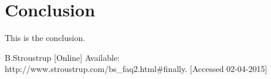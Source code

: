 \documentclass[11pt, oneside]{article}   %
\begin{document}
\newpage
\newpage
\section{Conclusion}
This is the conclusion.

\newpage

\begin{thebibliography}{10}

 B.Stroustrup [Online] Available: http://www.stroustrup.com/bs\_faq2.html\#finally. [Accessed 02-04-2015]

\end{thebibliography}
\end{document}

